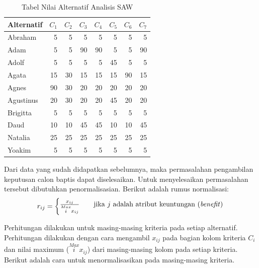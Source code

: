 \begin{table}[H]
	\centering
	\caption{Tabel Nilai Alternatif Analisis SAW}
		\begin{tabular}{|l|r|r|r|r|r|r|r|} \hline
		 Alternatif    & $C_{1}$ & $C_{2}$ & $C_{3}$ & $C_{4}$ & $C_{5}$ & $C_{6}$ & $C_{7}$ \\
    \hline
    Abraham     & 5&5&5&5&5&5&5     \\ \hline
    Adam	      & 5&5&90&90&5&5&90    \\ \hline
    Adolf       & 5&5&5&5&45&5&5      \\ \hline
    Agata       & 15&30&15&15&15&90&15  \\ \hline
		Agnes    		& 90&30&20&20&20&20&20     \\ \hline
    Agustinus	  & 20&30&20&20&45&20&20    \\ \hline
    Brigitta    & 5&5&5&5&5&5&5      \\ \hline
    Daud       	& 10&10&45&45&10&10&45  \\ \hline
		Natalia     & 25&25&25&25&25&25&25      \\ \hline
    Yoakim      & 5&5&5&5&5&5&5  \\ \hline
				\end{tabular}
	\label{table:nilaialternatifsaw}
\end{table}


Dari data yang sudah didapatkan sebelumnya, maka permasalahan pengambilan keputusan calon baptis dapat diselesaikan. Untuk menyelesaikan permasalahan tersebut dibutuhkan penormalisasian. Berikut adalah rumus normalisasi:
	\[ r_{ij}  =
  \begin{cases}
    \frac{x_{ij}}{\stackrel{Max}{i} x_{ij}}      & \quad \text{jika } j \text{ adalah atribut keuntungan (\textit{benefit})}\\
	\end{cases}	  
\]

Perhitungan dilakukan untuk masing-masing kriteria pada setiap alternatif. Perhitungan dilakukan dengan cara mengambil $x_{ij}$ pada bagian kolom kriteria $C_{i}$ dan nilai maximum (${\stackrel{Max}{i} x_{ij}}$) dari masing-masing kolom pada setiap kriteria. Berikut adalah cara untuk menormalisasikan pada masing-masing kriteria.

